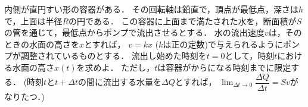 \documentclass[../../main.tex]{subfiles}
\begin{document}
内側が直円すい形の容器がある．
その回転軸は鉛直で，頂点が最低点，深さは$h$で，上面は半径$R$の円である．
この容器に上面まで満たされた水を，断面積が$S$の管を通じて，最低点からポンプで流出させるとする．
水の流出速度$v$は，そのときの水面の高さを$x$とすれば，
$v=kx$ ($k$は正の定数)で与えられるようにポンプが調整されているものとする．
流出し始めた時刻を$t=0$として，時刻$t$における水面の高さ$x(t)$を求めよ．
ただし，$t$は容器がからになる時刻までに限定する．
(時刻$t$と$t+\Delta t$の間に流出する水量を$\Delta Q$とすれば，
$\displaystyle\lim_{\Delta t\to0}\dfrac{\Delta Q}{\Delta t}=Sv$がなりたつ．)
\end{document}
